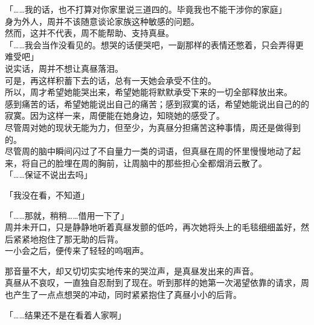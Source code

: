 「……我的话，也不打算对你家里说三道四的。毕竟我也不能干涉你的家庭」\\

身为外人，周并不该随意谈论家族这种敏感的问题。\\

然而，这并不代表，周不能帮助、支持真昼。\\

「……我会当作没看见的。想哭的话便哭吧，一副那样的表情还憋着，只会弄得更难受吧」\\

说实话，周并不想让真昼落泪。\\

可是，再这样积蓄下去的话，总有一天她会承受不住的。\\

所以，周才希望她能哭出来，希望她能将默默承受下来的一切全部释放出来。\\

感到痛苦的话，希望她能说出自己的痛苦；感到寂寞的话，希望她能说出自己的的寂寞。因为这样一来，周便能在她身边，知晓她的感受了。\\

尽管周对她的现状无能为力，但至少，为真昼分担痛苦这种事情，周还是做得到的。\\

尽管周的脑中瞬间闪过了不自量力一类的词语，但真昼在周的怀里慢慢地动了起来，将自己的脸埋在周的胸前，让周脑中的那些担心全都烟消云散了。\\

「……保证不说出去吗」

「我没在看，不知道」

「……那就，稍稍……借用一下了」\\

周并未开口，只是静静地听着真昼发颤的低吟，再次她将头上的毛毯细细盖好，然后紧紧地抱住了那无助的后背。\\

一小会之后，便传来了轻轻的呜咽声。

那音量不大，却又切切实实地传来的哭泣声，是真昼发出来的声音。\\

真昼从不哀叹，一直独自忍耐到了现在。听到那样的她第一次渴望依靠的请求，周也产生了一点点想哭的冲动，同时紧紧抱住了真昼小小的后背。\\

\vspace{2\baselineskip}

「……结果还不是在看着人家啊」\\

